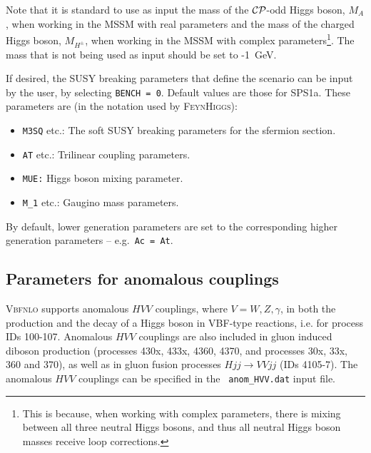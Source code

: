 \documentclass[english,12pt]{article}
\begin{document}
 Note that it is standard to use as input the mass of the $\cal{CP}$-odd Higgs boson,
$M_{A}$, when working in the MSSM with real parameters and the mass of the
charged Higgs boson, $M_{H^{\pm}}$, when working in the MSSM with complex
parameters\footnote{This is because, when working with complex parameters, there
is mixing between all three neutral Higgs bosons, and thus all neutral Higgs boson
masses receive loop corrections.}.  The mass that is not being used as input should
be set to -1~GeV.

If desired, the SUSY breaking parameters that define the scenario can be input
by the user, by selecting {\tt BENCH = 0}.  Default values are those for SPS1a. 
These parameters are (in the notation used by \textsc{FeynHiggs}):
\begin{itemize}
 \item {\tt M3SQ} etc.: The soft SUSY breaking parameters for the sfermion section.
 \item {\tt AT} etc.: Trilinear coupling parameters.
 \item {\tt MUE:} Higgs boson mixing parameter.
 \item {\tt M\_1} etc.: Gaugino mass parameters.
\end{itemize}
By default, lower generation parameters are set to the corresponding higher generation parameters -- e.g.\ {\tt Ac = At}.


\subsection{Parameters for anomalous couplings}

\textsc{Vbfnlo} supports anomalous $HVV$ couplings, where $V=W,Z,\gamma$, in
both the production and the decay of a Higgs boson in VBF-type reactions,  i.e.
for process IDs 100-107. Anomalous $HVV$ couplings are also included in gluon
induced diboson production (processes 430x, 433x, 4360, 4370, and processes 30x,
33x, 360 and 370), as well as in gluon fusion processes $Hjj \rightarrow VVjj$
(IDs 4105-7). The anomalous $HVV$ couplings can be specified in the {\tt
anom\_HVV.dat} input file.
\end{document}
